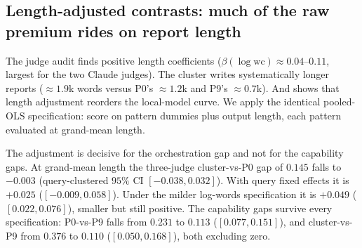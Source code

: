 \documentclass[11pt]{article}
\begin{document}
\subsection{Length-adjusted contrasts: much of the raw premium rides on report length}\label{sec:lengthadj}
The judge audit finds positive length coefficients
($\beta(\log\text{wc})\approx0.04$--$0.11$, largest for the two Claude judges). The
cluster writes systematically longer reports ($\approx\!1.9$k words versus P0's
$\approx\!1.2$k and P9's $\approx\!0.7$k). And  shows that length
adjustment reorders the local-model curve. We apply the identical pooled-OLS specification:
score on pattern dummies plus output length, each pattern evaluated at grand-mean
length.

The adjustment is decisive for the orchestration gap and not for the capability gaps. At
grand-mean length the three-judge cluster-vs-P0 gap of $0.145$ falls to $-0.003$
(query-clustered $95\%$ CI $[-0.038, 0.032]$). With query fixed effects it is $+0.025$
($[-0.009, 0.058]$). Under the milder log-words specification it is $+0.049$ ($[0.022,
0.076]$), smaller but still positive. The capability gaps survive every specification:
P0-vs-P9 falls from $0.231$ to $0.113$ ($[0.077, 0.151]$), and cluster-vs-P9 from
$0.376$ to $0.110$ ($[0.050, 0.168]$), both excluding zero.
\end{document}
